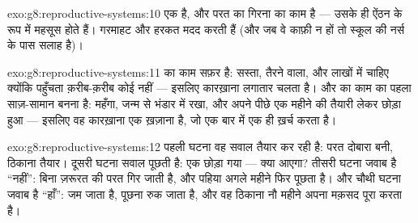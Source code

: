 \begin{solution}{exo:g8:reproductive-systems:10}
 एक  है, और परत का गिरना  का काम है --- उसके  ही
ऐंठन के रूप में महसूस होते हैं। गरमाहट और हरकत मदद करती हैं (और जब वे
काफ़ी न हों तो स्कूल की नर्स के पास सलाह है)।
\end{solution}

\begin{solution}{exo:g8:reproductive-systems:11}
 का काम सफ़र है: सस्ता, तैरने वाला, और लाखों में चाहिए क्योंकि
पहुँचता क़रीब-क़रीब कोई नहीं --- इसलिए कारख़ाना लगातार चलता है। और 
का काम  का पहला साज़-सामान बनना है: महँगा, जन्म से भंडार में
रखा, और अपने पीछे एक महीने की तैयारी लेकर छोड़ा हुआ --- इसलिए वह
कारख़ाना एक ख़ज़ाना है, जो एक बार में एक ही ख़र्च करता है।
\end{solution}

\begin{solution}{exo:g8:reproductive-systems:12}
पहली घटना वह सवाल तैयार कर रही है: परत दोबारा बनी, ठिकाना तैयार। दूसरी
घटना सवाल पूछती है: एक  छोड़ा गया --- क्या  आएगा? तीसरी घटना
जवाब है ``नहीं'': बिना ज़रूरत की परत गिर जाती है, और पहिया अगले महीने
फिर पूछता है। और चौथी घटना जवाब है ``हाँ'':  जम जाता है, पूछना
रुक जाता है, और वह ठिकाना नौ महीने अपना मक़सद पूरा करता है।
\end{solution}

